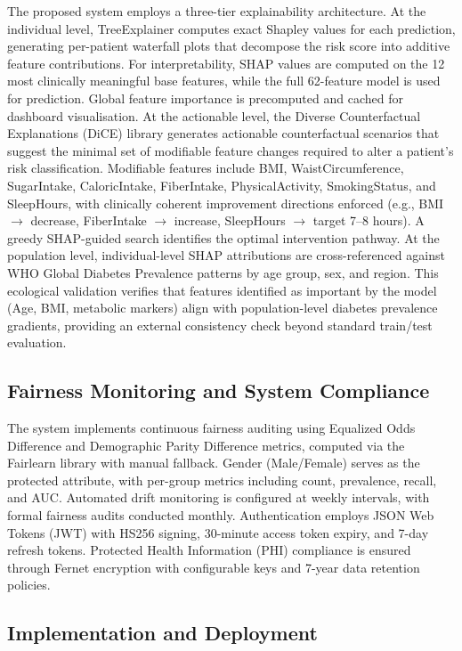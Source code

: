 \documentclass[conference]{IEEEtran}
\begin{document}
The proposed system employs a three-tier explainability architecture. At the individual level, TreeExplainer computes exact Shapley values for each prediction, generating per-patient waterfall plots that decompose the risk score into additive feature contributions. For interpretability, SHAP values are computed on the 12 most clinically meaningful base features, while the full 62-feature model is used for prediction. Global feature importance is precomputed and cached for dashboard visualisation. At the actionable level, the Diverse Counterfactual Explanations (DiCE) library generates actionable counterfactual scenarios that suggest the minimal set of modifiable feature changes required to alter a patient's risk classification. Modifiable features include BMI, WaistCircumference, SugarIntake, CaloricIntake, FiberIntake, PhysicalActivity, SmokingStatus, and SleepHours, with clinically coherent improvement directions enforced (e.g., BMI $\rightarrow$ decrease, FiberIntake $\rightarrow$ increase, SleepHours $\rightarrow$ target 7--8 hours). A greedy SHAP-guided search identifies the optimal intervention pathway. At the population level, individual-level SHAP attributions are cross-referenced against WHO Global Diabetes Prevalence patterns by age group, sex, and region. This ecological validation verifies that features identified as important by the model (Age, BMI, metabolic markers) align with population-level diabetes prevalence gradients, providing an external consistency check beyond standard train/test evaluation.

\subsection{Fairness Monitoring and System Compliance}

The system implements continuous fairness auditing using Equalized Odds Difference and Demographic Parity Difference metrics, computed via the Fairlearn library with manual fallback. Gender (Male/Female) serves as the protected attribute, with per-group metrics including count, prevalence, recall, and AUC. Automated drift monitoring is configured at weekly intervals, with formal fairness audits conducted monthly. Authentication employs JSON Web Tokens (JWT) with HS256 signing, 30-minute access token expiry, and 7-day refresh tokens. Protected Health Information (PHI) compliance is ensured through Fernet encryption with configurable keys and 7-year data retention policies.

\subsection{Implementation and Deployment}
\end{document}
